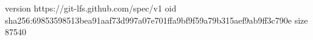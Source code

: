 version https://git-lfs.github.com/spec/v1
oid sha256:69853598513bea91aaf73d997a07e701ffa9bf9f59a79b315aef9ab9ff3c790e
size 87540
